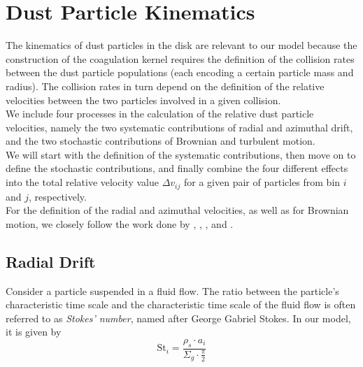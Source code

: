 \clearpage\section{Dust Particle Kinematics}

    The kinematics of dust particles in the disk are relevant to our model
    because the construction of the coagulation kernel requires the 
    definition of the collision rates between the dust particle populations 
    (each encoding a certain particle mass and radius).
    The collision rates in turn depend on the definition of the
    relative velocities between the two particles involved in a given collision. \\

    We include four processes in the calculation of the relative dust particle velocities, namely 
    the two systematic contributions of radial and azimuthal drift, and the two stochastic 
    contributions of Brownian and turbulent motion. \\

    We will start with the definition of the systematic contributions, then move on to define 
    the stochastic contributions, and finally combine the four different effects into the 
    total relative velocity value $\Delta v_{ij}$ for a given pair of particles from 
    bin $i$ and $j$, respectively. \\

    For the definition of the radial and azimuthal velocities, as well as for Brownian motion, 
    we closely follow the work done by \cite{weidenschilling_1977}, \cite{nakagawa_1986}, 
    \cite{birnstiel_dullemond_brauer_2010}, and \cite{dullemond_dominik_2004}.

    \subsection{Radial Drift}

        Consider a particle suspended in a fluid flow. The ratio between the particle's 
        characteristic time scale and the characteristic time scale of the fluid flow
        is often referred to as \textit{Stokes' number}, named after George Gabriel Stokes. 
        In our model, it is given by
        \begin{equation}
            \text{St}_i=\frac{\rho_s\cdot a_i}{\Sigma_g\cdot\frac{\pi}{2}}
        \end{equation}

